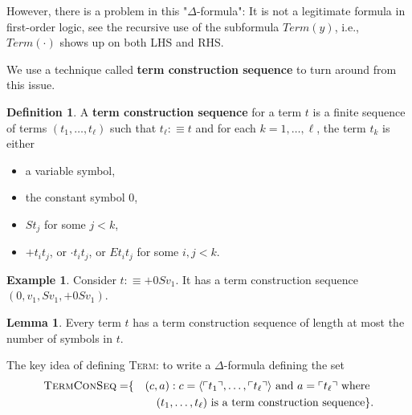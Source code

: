 \documentclass[11pt,letterpaper]{book}
\theoremstyle{definition}
\newtheorem{definition}{Definition}[section]
\newtheorem{lemma}{Lemma}[section]
\newtheorem{example}{Example}[section]
\begin{document}
However, there is a problem in this "$\Delta$-formula": It is not a legitimate formula in first-order logic, see the recursive use of the subformula $Term(y)$, i.e., $Term(\cdot)$ shows up on both LHS and RHS.

We use a technique called \textbf{term construction sequence} to turn around from this issue.

\begin{definition}
A \textbf{term construction sequence} for a term $t$ is a finite sequence of terms $(t_1, \ldots, t_{\ell} )$ such that $t_{\ell} :\equiv t $ and for each $k =1, \ldots, \ell$, the term $t_k$ is either
\begin{itemize}
\item{a variable symbol,}
\item{the constant symbol $0$,}
\item{$S t_j$ for some $j < k $,}
\item{$+ t_i t_j $, or $ \cdot t_i t_j$, or $E t_i t_j$ for some $i, j < k$.} 
\end{itemize}
\end{definition}

\begin{example}
Consider $t :\equiv +0 S v_1$. It has a term construction sequence $(0, v_1, S v_1, +0 S v_1)$.
\end{example}

\begin{lemma}
Every term $t$ has a term construction sequence of length at most the number of symbols in $t$.
\end{lemma}

The key idea of defining \textsc{Term}: to write a $\Delta$-formula defining the set
\begin{eqnarray*}
\text{\textsc{TermConSeq}} =  & \{ & (c, a) : c =  \langle \ulcorner t_1 \urcorner, \ldots, \ulcorner t_{\ell} \urcorner \rangle \text{ and } a = \ulcorner t_{\ell} \urcorner \text{ where } \\
& & (t_1, \ldots, t_{\ell}) \text{ is a term construction sequence}  \}.
\end{eqnarray*}
\end{document}
